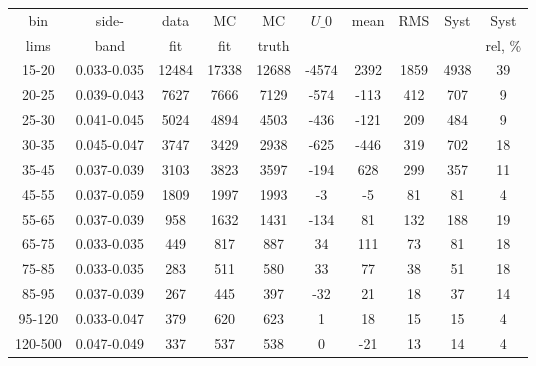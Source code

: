 \documentclass{beamer}
\begin{document}
\begin{frame}
\begin{table}[h]
\begin{center}
\begin{tabular}{|c|c|c|c|c|c|c|c|c|c|}
    bin & side- & data & MC & MC    & $U\_{0}$ & mean & RMS & Syst & Syst \\ 
    lims & band & fit & fit & truth &       &      &     &      & rel, \% \\ \hline
    15-20 & 0.033-0.035 & 12484 & 17338 & 12688 & -4574 & 2392 & 1859 & 4938 & 39  \\ \hline
    20-25 & 0.039-0.043 & 7627 & 7666 & 7129 & -574 & -113 & 412 & 707 & 9  \\ \hline
    25-30 & 0.041-0.045 & 5024 & 4894 & 4503 & -436 & -121 & 209 & 484 & 9  \\ \hline
    30-35 & 0.045-0.047 & 3747 & 3429 & 2938 & -625 & -446 & 319 & 702 & 18  \\ \hline
    35-45 & 0.037-0.039 & 3103 & 3823 & 3597 & -194 & 628 & 299 & 357 & 11  \\ \hline
    45-55 & 0.037-0.059 & 1809 & 1997 & 1993 & -3 & -5 & 81 & 81 & 4  \\ \hline
    55-65 & 0.037-0.039 & 958 & 1632 & 1431 & -134 & 81 & 132 & 188 & 19  \\ \hline
    65-75 & 0.033-0.035 & 449 & 817 & 887 & 34 & 111 & 73 & 81 & 18  \\ \hline
    75-85 & 0.033-0.035 & 283 & 511 & 580 & 33 & 77 & 38 & 51 & 18  \\ \hline
    85-95 & 0.037-0.039 & 267 & 445 & 397 & -32 & 21 & 18 & 37 & 14  \\ \hline
    95-120 & 0.033-0.047 & 379 & 620 & 623 & 1 & 18 & 15 & 15 & 4  \\ \hline
    120-500 & 0.047-0.049 & 337 & 537 & 538 & 0 & -21 & 13 & 14 & 4  \\ \hline
  \end{tabular}
  \label{tab:systSbVar_Meth1_MUON_WGamma_Endcap}
  \end{center}
\end{table}
\end{frame}
\end{document}
